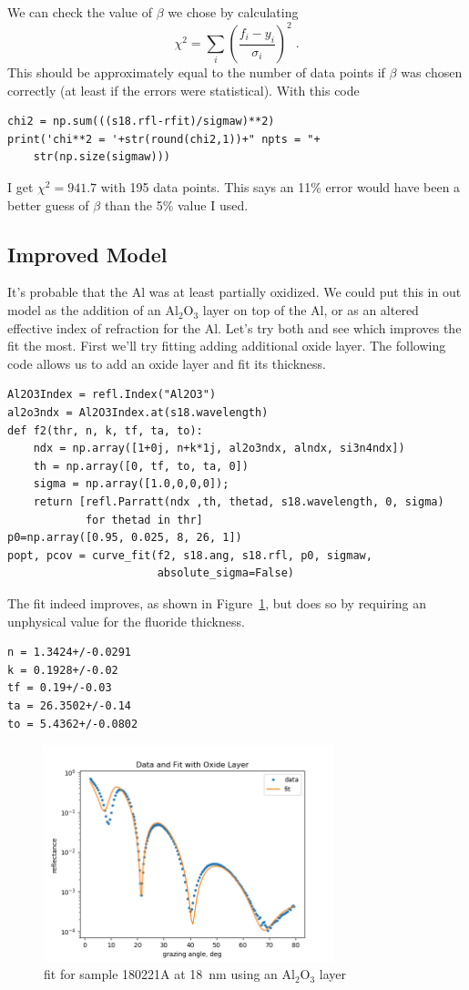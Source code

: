 \documentclass[english]{scrartcl}
\begin{document}
We can check the value of $\beta$ we chose by calculating
\begin{equation}
\chi^2=\sum_i\left(\frac{f_i-y_i}{\sigma_i}\right)^2\;.
\end{equation}
This should be approximately equal to the number of data points
if $\beta$ was chosen correctly (at least if the errors were statistical).
With this code
\begin{lstlisting}
chi2 = np.sum(((s18.rfl-rfit)/sigmaw)**2)
print('chi**2 = '+str(round(chi2,1))+" npts = "+
	str(np.size(sigmaw)))
\end{lstlisting}
I get $\chi^2=941.7$ with 195 data points. This says an 11\% error
would have been a better guess of $\beta$ than the 5\% value
I used.
\subsection{Improved Model}
It's probable that the Al was at least partially oxidized. We could
put this in out model as the addition of an Al$_2$O$_3$ layer on top
of the Al, or as an altered effective index of refraction for the
Al. Let's try both and see which improves the fit the most. First we'll
try fitting adding additional oxide layer.
The following code allows us to add an oxide layer and fit its
thickness.
\begin{lstlisting}
Al2O3Index = refl.Index("Al2O3")
al2o3ndx = Al2O3Index.at(s18.wavelength)
def f2(thr, n, k, tf, ta, to):
    ndx = np.array([1+0j, n+k*1j, al2o3ndx, alndx, si3n4ndx])
    th = np.array([0, tf, to, ta, 0])
    sigma = np.array([1.0,0,0,0]);
    return [refl.Parratt(ndx ,th, thetad, s18.wavelength, 0, sigma)
            for thetad in thr]
p0=np.array([0.95, 0.025, 8, 26, 1])
popt, pcov = curve_fit(f2, s18.ang, s18.rfl, p0, sigmaw,
                       absolute_sigma=False)
\end{lstlisting}
The fit indeed improves, as shown in Figure~\ref{fig:fit18oxide}, but
does so by requiring an unphysical value for the fluoride thickness.
\begin{lstlisting}
n = 1.3424+/-0.0291
k = 0.1928+/-0.02
tf = 0.19+/-0.03
ta = 26.3502+/-0.14
to = 5.4362+/-0.0802
\end{lstlisting}
\begin{figure}[htb]
  \begin{center}
    \includegraphics[width=0.75\textwidth]{images/fit18oxide}
  \end{center}
  \caption{\label{fig:fit18oxide}fit for sample 180221A at 18~nm using
  an Al$_2$O$_3$ layer}
\end{figure}
\end{document}
